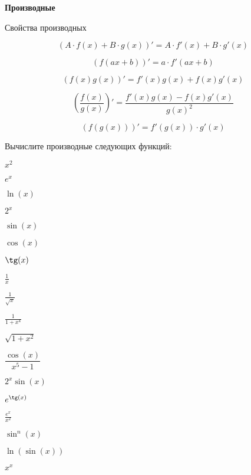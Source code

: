 \documentclass{article}
\begin{document}
    \large

    \begin{center}
        \textbf{Производные}
    \end{center}


    Свойства производных
    \begin{enumerate_boxed}
        \item \[(A\cdot f(x) + B\cdot g(x))' = A \cdot f'(x) + B\cdot g'(x)\]
        \item \[(f(ax + b))' = a \cdot f'(ax + b)\]
        \item \[(f(x)g(x))' = f'(x)g(x) + f(x)g'(x)\]
        \item \[\left(\frac{f(x)}{g(x)}\right)' = \frac{f'(x)g(x) - f(x)g'(x)}{g(x)^2}\]
        \item \[(f(g(x)))' = f'(g(x)) \cdot g'(x)\]
    \end{enumerate_boxed}

    Вычислите производные следующих функций:\\
    \begin{enumerate_boxed}
        \setcounter{enumi}{5}
        \begin{multicols}{4}
            \item $x^2$

            \item $e^x$

            \item $\ln(x)$

            \item $2^x$

            \item $\sin(x)$

            \item $\cos(x)$

            \item $\tg(x)$

            \item $\frac{1}{x}$

            \item $\frac{1}{\sqrt{x}}$

            \item $\frac{1}{1 + x^4}$

            \item $\sqrt{1 + x^2}$

            \item $\dfrac{\cos(x)}{x^5 - 1}$

            \item $2^x\sin(x)$

            \item $e^{\tg(x)}$

            \item $\frac{e^x}{x^2}$

            \item $\sin^n(x)$

            \item $\ln(\sin(x))$

            \item[\protect\fbox{23*}] $x^x$
        \end{multicols}
    \end{enumerate_boxed}
\end{document}
